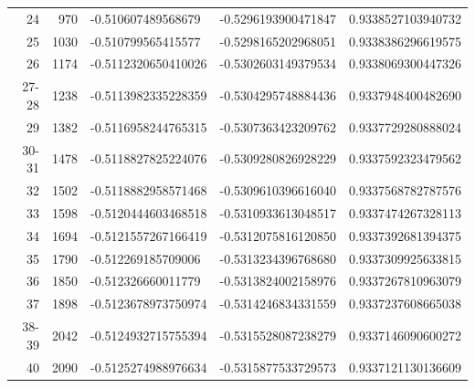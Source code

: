 \documentclass[10pt,twoside]{report}
\begin{document}
\begin{table}
\begin{tabular}{rrlll}
			24 & 970 & -0.510607489568679 & -0.5296193900471847 & 0.9338527103940732\\ 
			25 & 1030 & -0.510799565415577 & -0.5298165202968051 & 0.9338386296619575\\ 
			26 & 1174 & -0.5112320650410026 & -0.5302603149379534 & 0.9338069300447326\\ 
			27-28 & 1238 & -0.5113982335228359 & -0.5304295748884436 & 0.9337948400482690\\ 
			29 & 1382 & -0.5116958244765315 & -0.5307363423209762 & 0.9337729280888024\\ 
			30-31 & 1478 & -0.5118827825224076 & -0.5309280826928229 & 0.9337592323479562\\ 
			32 & 1502 & -0.5118882958571468 & -0.5309610396616040 & 0.9337568782787576\\ 
			33 & 1598 & -0.5120444603468518 & -0.5310933613048517 & 0.9337474267328113\\ 
			34 & 1694 & -0.5121557267166419 & -0.5312075816120850 & 0.9337392681394375\\ 
			35 & 1790 & -0.512269185709006 & -0.5313234396768680 & 0.9337309925633815\\ 
			36 & 1850 & -0.512326660011779 & -0.5313824002158976 & 0.9337267810963079\\ 
			37 & 1898 & -0.5123678973750974 & -0.5314246834331559 & 0.9337237608665038\\ 
			38-39 & 2042 & -0.5124932715755394 & -0.5315528087238279 & 0.9337146090600272\\ 
			40 & 2090 & -0.5125274988976634 & -0.5315877533729573 & 0.9337121130136609\\ 
		\end{tabular}
		\label{Appendix B | table | CCDT for HEG Nh14 rs=1.0}
	\end{table}
	\newpage
	
\end{document}
